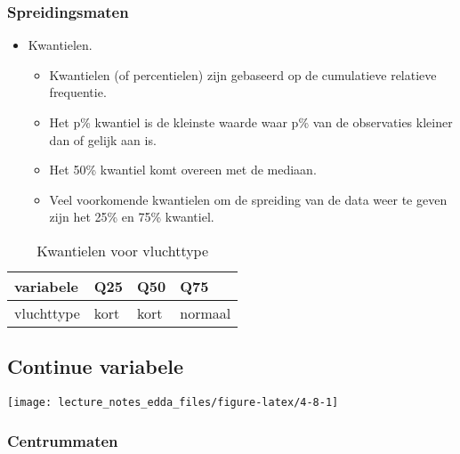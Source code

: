 \documentclass[]{memoir}
\providecommand{\tightlist}{%
  \setlength{\itemsep}{0pt}\setlength{\parskip}{0pt}}
\begin{document}
\hypertarget{spreidingsmaten}{%
\subsubsection*{Spreidingsmaten}\label{spreidingsmaten}}

\begin{itemize}
\tightlist
\item
  Kwantielen.

  \begin{itemize}
  \tightlist
  \item
    Kwantielen (of percentielen) zijn gebaseerd op de cumulatieve relatieve frequentie.
  \item
    Het p\% kwantiel is de kleinste waarde waar p\% van de observaties kleiner dan of gelijk aan is.
  \item
    Het 50\% kwantiel komt overeen met de mediaan.
  \item
    Veel voorkomende kwantielen om de spreiding van de data weer te geven zijn het 25\% en 75\% kwantiel.
  \end{itemize}
\end{itemize}

\begin{table}[t]

\caption{\label{tab:4-7}Kwantielen voor vluchttype}
\centering
\fontsize{10}{12}\selectfont
\begin{tabular}{llll}
\toprule
variabele & Q25 & Q50 & Q75\\
\midrule
vluchttype & kort & kort & normaal\\
\bottomrule
\end{tabular}
\end{table}

\hypertarget{continue-variabele-1}{%
\subsection{Continue variabele}\label{continue-variabele-1}}

\texttt{[image: lecture\_notes\_edda\_files/figure-latex/4-8-1]}

\hypertarget{centrummaten-1}{%
\subsubsection*{Centrummaten}\label{centrummaten-1}}
\end{document}
